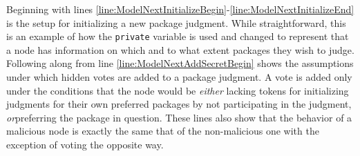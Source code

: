 Beginning with lines \ref{line:ModelNextInitializeBegin}-\ref{line:ModelNextInitializeEnd} is the setup for initializing a new package judgment. While straightforward, this is an example of how the \texttt{private} variable is used and changed to represent that a node has information on which and to what extent packages they wish to judge. Following along from line \ref{line:ModelNextAddSecretBegin} shows the assumptions under which hidden votes are added to a package judgment. A vote is added only under the conditions that the node would be \emph{either} lacking tokens for initializing judgments for their own preferred packages by not participating in the judgment, \emph{or}preferring the package in question. These lines also show that the behavior of a malicious node is exactly the same that of the non-malicious one with the exception of voting the opposite way.